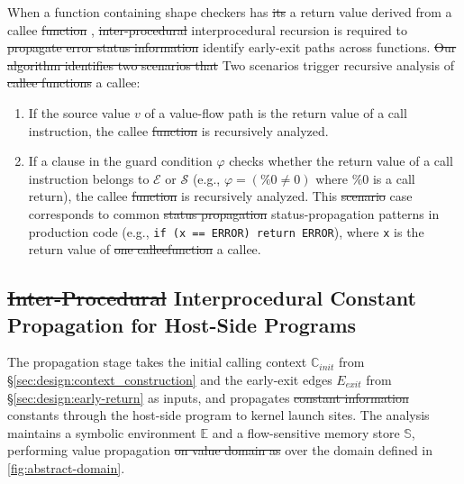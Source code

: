 \documentclass[manuscript,screen,review]{acmart}
\theoremstyle{indenteditalic}
\providecommand{\DIFaddtex}[1]{{\protect\color{blue}#1}} %
\providecommand{\DIFidentity}[1]{#1}
\providecommand{\DIFdeltex}[1]{{%
  \protect\color{red}%
  \normalfont\normalsize
  \let\textbf\DIFidentity
  \let\textit\DIFidentity
  \let\texttt\DIFidentity
  \let\textsc\DIFidentity
  \let\textsf\DIFidentity
  \let\emph\DIFidentity
  \let\uline\DIFidentity
  \sout{#1}%
}} %
\providecommand{\DIFaddbegin}{} %
\providecommand{\DIFaddend}{} %
\providecommand{\DIFdelbegin}{} %
\providecommand{\DIFdelend}{} %
\providecommand{\DIFadd}[1]{\texorpdfstring{\DIFaddtex{#1}}{#1}} %
\providecommand{\DIFdel}[1]{\texorpdfstring{\DIFdeltex{#1}}{}} %
\begin{document}
When a function containing shape checkers has \DIFdelbegin \DIFdel{its }\DIFdelend \DIFaddbegin \DIFadd{a }\DIFaddend return value derived from a callee\DIFdelbegin \DIFdel{function}\DIFdelend , \DIFdelbegin\DIFdel{inter-procedural}\DIFdelend\DIFaddbegin\DIFadd{interprocedural}\DIFaddend{} recursion is required to \DIFdelbegin \DIFdel{propagate error status information }\DIFdelend \DIFaddbegin \DIFadd{identify early-exit paths }\DIFaddend across functions.
\DIFdelbegin \DIFdel{Our algorithm identifies two scenarios that }\DIFdelend \DIFaddbegin \DIFadd{Two scenarios }\DIFaddend trigger recursive analysis of \DIFdelbegin \DIFdel{callee functions}\DIFdelend \DIFaddbegin \DIFadd{a callee}\DIFaddend :
\begin{enumerate}
	\item If the source value $v$ of a value-flow path is the return value of a call instruction, the callee \DIFdelbegin \DIFdel{function }\DIFdelend is recursively analyzed.
	\item If a clause in the guard condition $\varphi$ checks whether the return value of a call instruction belongs to $\mathcal{E}$ or $\mathcal{S}$ (e.g., $\varphi = (\%0 \neq 0)$  where $\%0$ is a call return), the callee \DIFdelbegin \DIFdel{function }\DIFdelend is recursively analyzed.
	This \DIFdelbegin \DIFdel{scenario }\DIFdelend \DIFaddbegin \DIFadd{case }\DIFaddend corresponds to common \DIFdelbegin \DIFdel{status propagation }\DIFdelend \DIFaddbegin \DIFadd{status-propagation }\DIFaddend patterns in production code (e.g., \texttt{if (x == ERROR) return ERROR})\DIFaddbegin \DIFadd{, }\DIFaddend where \texttt{x} is \DIFaddbegin \DIFadd{the }\DIFaddend return value of \DIFdelbegin \DIFdel{one calleefunction}\DIFdelend \DIFaddbegin \DIFadd{a callee}\DIFaddend .
\end{enumerate}

\subsection{\DIFdel{Inter-Procedural}\DIFadd{Interprocedural} Constant Propagation for Host-Side Programs}\label{sec:design:propagation}

The propagation stage takes the initial calling context $\mathbb{C}_{init}$ from \S\ref{sec:design:context_construction} and the early-exit edges $E_{exit}$ from \S\ref{sec:design:early-return} as inputs, and propagates \DIFdelbegin \DIFdel{constant information }\DIFdelend \DIFaddbegin \DIFadd{constants }\DIFaddend through the host-side program to kernel launch sites.
The analysis maintains a symbolic environment $\mathbb{E}$ and a flow-sensitive memory store $\mathbb{S}$, performing value propagation \DIFdelbegin \DIFdel{on value domain as }\DIFdelend \DIFaddbegin \DIFadd{over the domain }\DIFaddend defined in \autoref{fig:abstract-domain}.
\end{document}
